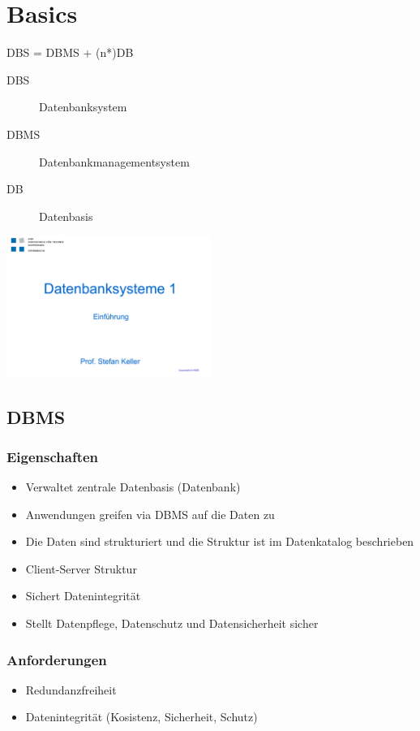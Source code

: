 \section{Basics}
    DBS = DBMS + (n*)DB
    \begin{description}
    \item[DBS] Datenbanksystem
    \item[DBMS] Datenbankmanagementsystem
    \item[DB] Datenbasis
    \end{description}
    \includegraphics[page=13,trim=20 40 20 140,clip=true,width=0.5\textwidth]{images/einfuehrung.pdf}
    \subsection {DBMS}
        \subsubsection{Eigenschaften}
            \begin{itemize}
              \item Verwaltet zentrale Datenbasis (Datenbank)
              \item Anwendungen greifen via DBMS auf die Daten zu
              \item Die Daten sind strukturiert und die Struktur ist im Datenkatalog beschrieben
              \item Client-Server Struktur
              \item Sichert Datenintegrität
              \item Stellt Datenpflege, Datenschutz und Datensicherheit sicher
            \end{itemize}
        \subsubsection{Anforderungen}
           \begin{itemize}
             \item Redundanzfreiheit
             \item Datenintegrität (Kosistenz, Sicherheit, Schutz)
           \end{itemize}

